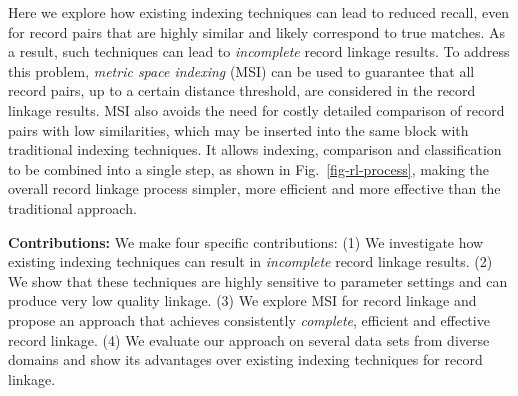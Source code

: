 \documentclass{llncs}
\begin{document}

Here we explore how existing indexing techniques can lead to
reduced recall, even for record pairs that are highly similar and likely
correspond to true matches. As a result, such techniques can lead
to \emph{incomplete} record linkage results. To address this problem,
\emph{metric space indexing} (MSI) can be used to guarantee that all
record pairs, up to a certain distance threshold, are considered in the
record linkage results. MSI also avoids the need for costly detailed
comparison of record pairs with low similarities, which may be inserted
into the same block with traditional indexing techniques. It allows
indexing, comparison and classification to be combined into a
single step, as shown in Fig.~\ref{fig-rl-process}, making the overall
record linkage process simpler, more efficient and more effective than
the traditional approach.




\smallskip
\textbf{Contributions:} We make four specific contributions: (1) We
investigate how existing indexing techniques can result in
\emph{incomplete} record linkage results. (2) We show that these
techniques are highly sensitive to parameter settings and can produce
very low quality linkage. (3) We explore MSI for record linkage and
propose an approach that achieves consistently \emph{complete},
efficient and effective record linkage. (4) We evaluate our approach on
several data sets from diverse domains and show its advantages over
existing indexing techniques for record linkage.


\end{document}
